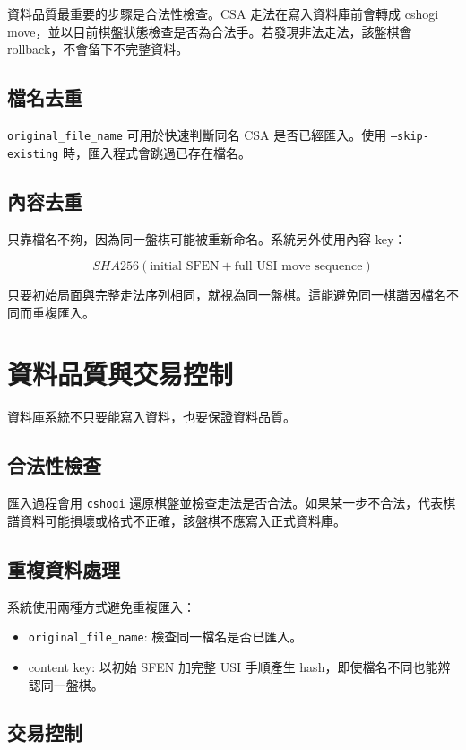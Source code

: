 \documentclass[12pt,a4paper,fontset=none]{ctexart}
\begin{document}
資料品質最重要的步驟是合法性檢查。CSA 走法在寫入資料庫前會轉成 cshogi move，並以目前棋盤狀態檢查是否為合法手。若發現非法走法，該盤棋會 rollback，不會留下不完整資料。

\subsection{檔名去重}

\texttt{original\_file\_name} 可用於快速判斷同名 CSA 是否已經匯入。使用 \texttt{--skip-existing} 時，匯入程式會跳過已存在檔名。

\subsection{內容去重}

只靠檔名不夠，因為同一盤棋可能被重新命名。系統另外使用內容 key：

\[
SHA256(\text{initial SFEN} + \text{full USI move sequence})
\]

只要初始局面與完整走法序列相同，就視為同一盤棋。這能避免同一棋譜因檔名不同而重複匯入。

\section{資料品質與交易控制}

資料庫系統不只要能寫入資料，也要保證資料品質。

\subsection{合法性檢查}

匯入過程會用 \texttt{cshogi} 還原棋盤並檢查走法是否合法。如果某一步不合法，代表棋譜資料可能損壞或格式不正確，該盤棋不應寫入正式資料庫。

\subsection{重複資料處理}

系統使用兩種方式避免重複匯入：

\begin{itemize}
  \item \texttt{original\_file\_name}: 檢查同一檔名是否已匯入。
  \item content key: 以初始 SFEN 加完整 USI 手順產生 hash，即使檔名不同也能辨認同一盤棋。
\end{itemize}

\subsection{交易控制}
\end{document}
